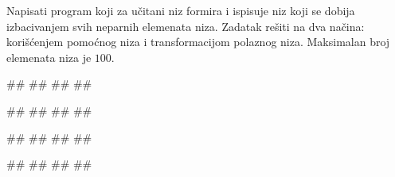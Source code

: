 \begin{Exercise}[label=p.izbacivanje_elemenata] 
Napisati program koji za učitani niz formira i ispisuje niz koji se
dobija izbacivanjem svih neparnih elemenata niza. Zadatak rešiti na
dva načina: korišćenjem pomoćnog niza i transformacijom polaznog
niza. Maksimalan broj elemenata niza je $100$.
 
\begin{miditest}
\begin{upotreba}{1}
#\naslovInt#
##
##
##
\end{upotreba}
\end{miditest}
\begin{miditest}
\begin{upotreba}{2}
#\naslovInt#
##
##
##
\end{upotreba}
\end{miditest}

\begin{miditest}
\begin{upotreba}{3}
#\naslovInt#
##
##
#\izlaz{}#
\end{upotreba}
\end{miditest}

\begin{maxitest}
\begin{upotreba}{4}
#\naslovInt#
##
##
##
\end{upotreba}
\end{maxitest}
\end{Exercise}

\ifresenja
\begin{Answer}[ref=p.izbacivanje_elemenata]
\end{Answer}
\fi


